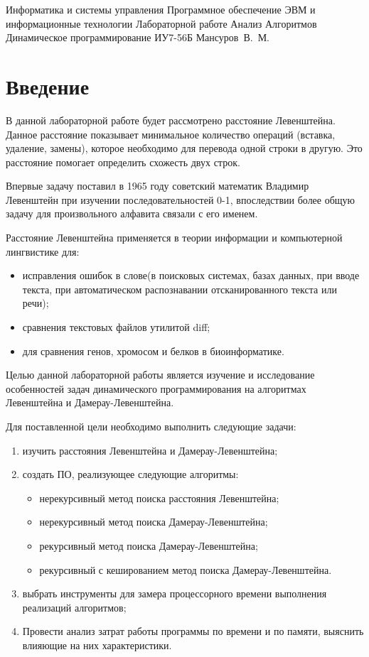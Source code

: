 \documentclass[a4paper,14pt, unknownkeysallowed]{bmstu}
\begin{document}
	\makereporttitle
	{Информатика и системы управления}
	{Программное обеспечение ЭВМ и информационные технологии}
	{Лабораторной работе}
	{Анализ Алгоритмов}
	{Динамическое программирование}
	{}
	{ИУ7-56Б}
	{Мансуров~В.~М.}
	{}

	\maketableofcontents
	\setcounter{page}{1}

\chapter*{Введение}

	В данной лабораторной работе будет рассмотрено расстояние Левенштейна. Данное расстояние показывает минимальное количество операций (вставка, удаление, замены), которое необходимо для перевода одной строки в другую. Это расстояние помогает определить схожесть двух строк.

	Впервые задачу поставил в 1965 году советский математик Владимир Левенштейн при изучении последовательностей 0-1, впоследствии более общую задачу для произвольного алфавита связали с его именем.

	Расстояние Левенштейна применяется в теории информации и компьютерной лингвистике для:
	\begin{itemize}
    	\item исправления ошибок в слове(в поисковых системах, базах данных, при вводе текста, при автоматическом распознавании отсканированного текста или речи);
    	\item сравнения текстовых файлов утилитой diff;
    	\item для сравнения генов, хромосом и белков в биоинформатике.
    \end{itemize}

	Целью данной лабораторной работы является изучение и исследование особенностей задач динамического программирования на алгоритмах Левенштейна и Дамерау-Левенштейна.

	Для поставленной цели необходимо выполнить следующие задачи:
	\begin{enumerate}[label={\arabic*)}]
	    \item изучить расстояния Левенштейна и Дамерау-Левенштейна;
	    \item создать ПО, реализующее следующие алгоритмы:
	    \begin{itemize}
    	    \item нерекурсивный метод поиска расстояния Левенштейна;
    	    \item нерекурсивный метод поиска Дамерау-Левенштейна;
    	    \item рекурсивный метод поиска Дамерау-Левенштейна;
    	    \item  рекурсивный с кешированием метод поиска Дамерау-Левенштейна.
        \end{itemize}
        \item выбрать инструменты для замера процессорного времени выполнения реализаций алгоритмов;
        \item Провести анализ затрат работы программы по времени и по памяти, выяснить влияющие на них характеристики.
    \end{enumerate}
\end{document}
